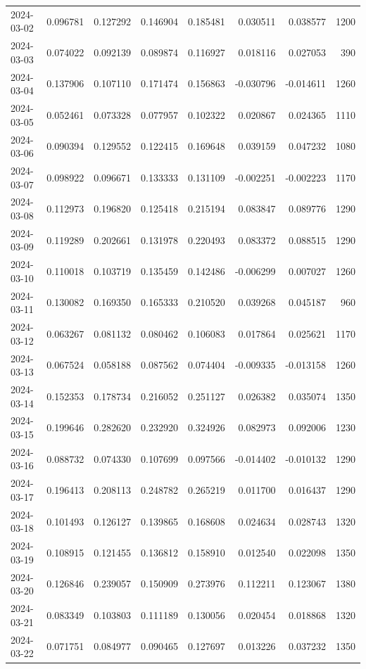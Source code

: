 \begin{tabular}{lrrrrrrr}
2024-03-02 & 0.096781 & 0.127292 & 0.146904 & 0.185481 & 0.030511 & 0.038577 & 1200 \\
2024-03-03 & 0.074022 & 0.092139 & 0.089874 & 0.116927 & 0.018116 & 0.027053 & 390 \\
2024-03-04 & 0.137906 & 0.107110 & 0.171474 & 0.156863 & -0.030796 & -0.014611 & 1260 \\
2024-03-05 & 0.052461 & 0.073328 & 0.077957 & 0.102322 & 0.020867 & 0.024365 & 1110 \\
2024-03-06 & 0.090394 & 0.129552 & 0.122415 & 0.169648 & 0.039159 & 0.047232 & 1080 \\
2024-03-07 & 0.098922 & 0.096671 & 0.133333 & 0.131109 & -0.002251 & -0.002223 & 1170 \\
2024-03-08 & 0.112973 & 0.196820 & 0.125418 & 0.215194 & 0.083847 & 0.089776 & 1290 \\
2024-03-09 & 0.119289 & 0.202661 & 0.131978 & 0.220493 & 0.083372 & 0.088515 & 1290 \\
2024-03-10 & 0.110018 & 0.103719 & 0.135459 & 0.142486 & -0.006299 & 0.007027 & 1260 \\
2024-03-11 & 0.130082 & 0.169350 & 0.165333 & 0.210520 & 0.039268 & 0.045187 & 960 \\
2024-03-12 & 0.063267 & 0.081132 & 0.080462 & 0.106083 & 0.017864 & 0.025621 & 1170 \\
2024-03-13 & 0.067524 & 0.058188 & 0.087562 & 0.074404 & -0.009335 & -0.013158 & 1260 \\
2024-03-14 & 0.152353 & 0.178734 & 0.216052 & 0.251127 & 0.026382 & 0.035074 & 1350 \\
2024-03-15 & 0.199646 & 0.282620 & 0.232920 & 0.324926 & 0.082973 & 0.092006 & 1230 \\
2024-03-16 & 0.088732 & 0.074330 & 0.107699 & 0.097566 & -0.014402 & -0.010132 & 1290 \\
2024-03-17 & 0.196413 & 0.208113 & 0.248782 & 0.265219 & 0.011700 & 0.016437 & 1290 \\
2024-03-18 & 0.101493 & 0.126127 & 0.139865 & 0.168608 & 0.024634 & 0.028743 & 1320 \\
2024-03-19 & 0.108915 & 0.121455 & 0.136812 & 0.158910 & 0.012540 & 0.022098 & 1350 \\
2024-03-20 & 0.126846 & 0.239057 & 0.150909 & 0.273976 & 0.112211 & 0.123067 & 1380 \\
2024-03-21 & 0.083349 & 0.103803 & 0.111189 & 0.130056 & 0.020454 & 0.018868 & 1320 \\
2024-03-22 & 0.071751 & 0.084977 & 0.090465 & 0.127697 & 0.013226 & 0.037232 & 1350 \\

\end{tabular}
